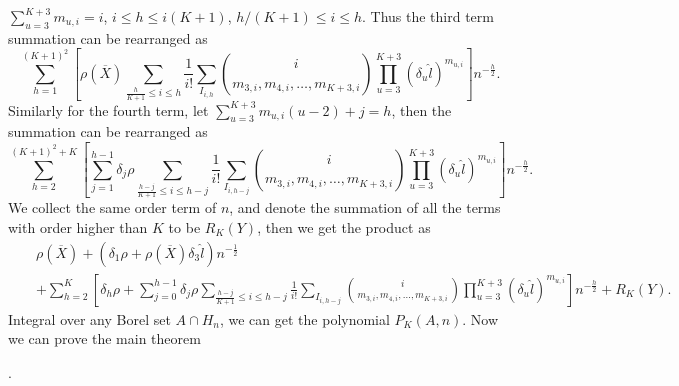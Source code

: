 $\sum_{u=3}^{K+3}m_{u,i}=i$, $i\le h\le i\left(K+1\right)$, $h/\left(K+1\right)\le i\le h$.
Thus the third term summation can be rearranged as 
\[
\sum_{h=1}^{\left(K+1\right)^{2}}\left[\rho\left(\overline{X}\right)\sum_{\frac{h}{K+1}\le i\le h}\frac{1}{i!}\sum_{I_{i,h}}\binom{i}{m_{3,i},m_{4,i},\ldots,m_{K+3,i}}\prod_{u=3}^{K+3}\left(\delta_{u}\hat{l}\right)^{m_{u,i}}\right]n^{-\frac{h}{2}}.
\]
Similarly for the fourth term, let $\sum_{u=3}^{K+3}m_{u,i}\left(u-2\right)+j=h$,
then the summation can be rearranged as 
\[
\sum_{h=2}^{\left(K+1\right)^{2}+K}\left[\sum_{j=1}^{h-1}\delta_{j}\rho\sum_{\frac{h-j}{K+1}\le i\le h-j}\frac{1}{i!}\sum_{I_{i,h-j}}\binom{i}{m_{3,i},m_{4,i},\ldots,m_{K+3,i}}\prod_{u=3}^{K+3}\left(\delta_{u}\hat{l}\right)^{m_{u,i}}\right]n^{-\frac{h}{2}}.
\]
We collect the same order term of $n$, and denote the summation of
all the terms with order higher than $K$ to be $R_{K}\left(Y\right)$,
then we get the product as 
\begin{eqnarray*}
 &  & \rho\left(\overline{X}\right)+\left(\delta_{1}\rho+\rho\left(\overline{X}\right)\delta_{3}\hat{l}\right)n^{-\frac{1}{2}}\\
 &  & +\sum_{h=2}^{K}\left[\delta_{h}\rho+\sum_{j=0}^{h-1}\delta_{j}\rho\sum_{\frac{h-j}{K+1}\le i\le h-j}\frac{1}{i!}\sum_{I_{i,h-j}}\binom{i}{m_{3,i},m_{4,i},\ldots,m_{K+3,i}}\prod_{u=3}^{K+3}\left(\delta_{u}\hat{l}\right)^{m_{u,i}}\right]n^{-\frac{h}{2}}+R_{K}\left(Y\right).
\end{eqnarray*}
 Integral over any Borel set $A\cap H_{n}$, we can get the polynomial
$P_{K}\left(A,n\right)$. Now we can prove the main theorem %
\begin{comment}
add ref to main theorem
\end{comment}
. 
